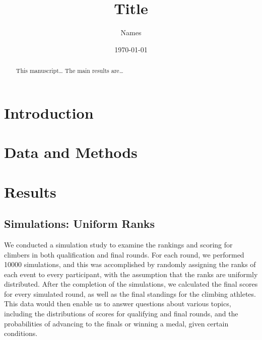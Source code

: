 \documentclass[
  11pt,
]{article}
\title{\textbf{Title}}
\author{Names}
\date{\today}
\begin{document}
\maketitle
\begin{abstract}
This manuscript\ldots{} The main results are\ldots{}
\end{abstract}

\hypertarget{introduction}{%
\section{Introduction}\label{introduction}}

\hypertarget{data-and-methods}{%
\section{Data and Methods}\label{data-and-methods}}

\hypertarget{results}{%
\section{Results}\label{results}}

\hypertarget{simulations-uniform-ranks}{%
\subsection{Simulations: Uniform
Ranks}\label{simulations-uniform-ranks}}

We conducted a simulation study to examine the rankings and scoring for
climbers in both qualification and final rounds. For each round, we
performed 10000 simulations, and this was accomplished by randomly
assigning the ranks of each event to every participant, with the
assumption that the ranks are uniformly distributed. After the
completion of the simulations, we calculated the final scores for every
simulated round, as well as the final standings for the climbing
athletes. This data would then enable us to answer questions about
various topics, including the distributions of scores for qualifying and
final rounds, and the probabilities of advancing to the finals or
winning a medal, given certain conditions.
\end{document}
